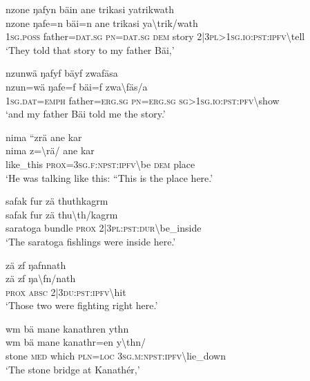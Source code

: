 \ea\label{ex:3:a7477}
nzone ŋafyn bäin ane trikasi yatrikwath\\
\gll nzone	ŋafe=n	bäi=n	ane	trikasi	ya{\textbackslash}trik/wath\\
     1\textsc{sg}.\textsc{poss}	father=\textsc{dat}.\textsc{sg}	\textsc{pn}=\textsc{dat}.\textsc{sg}	\textsc{dem}	story	2|3\textsc{pl}>1\textsc{sg}.\textsc{io}:\textsc{pst}:\textsc{ipfv}{\textbackslash}tell\\
\glt `They told that story to my father Bäi,'
\z

\newpage
\ea\label{ex:3:a7478}
nzunwä ŋafyf bäyf zwafäsa\\
\gll nzun=wä	ŋafe=f	bäi=f	zwa{\textbackslash}fäs/a\\
     1\textsc{sg}.\textsc{dat}=\textsc{emph}	father=\textsc{erg}.\textsc{sg}	\textsc{pn}=\textsc{erg}.\textsc{sg}	\textsc{sg}>1\textsc{sg}.\textsc{io}:\textsc{pst}:\textsc{pfv}{\textbackslash}show\\
\glt `and my father Bäi told me the story.'
\z

\ea\label{ex:3:a7480}
nima ``zrä ane kar\\
\gll nima	z={\textbackslash}rä/	ane	kar\\
     like\_this	\textsc{prox}=3\textsc{sg}.\textsc{f}:\textsc{npst}:\textsc{ipfv}{\textbackslash}be	\textsc{dem}	place\\
\glt `He was talking like this: ``This is the place here.'
\z

\ea\label{ex:3:a7481}
safak fur zä thuthkagrm\\
\gll safak	fur	zä	thu{\textbackslash}th/kagrm\\
     saratoga	bundle	\textsc{prox}	2|3\textsc{pl}:\textsc{pst}:\textsc{dur}{\textbackslash}be\_inside\\
\glt `The saratoga fishlings were inside here.'
\z

\ea\label{ex:3:a7482}
zä zf ŋafnnath\\
\gll zä	zf	ŋa{\textbackslash}fn/nath\\
     \textsc{prox}	\textsc{absc}	2|3\textsc{du}:\textsc{pst}:\textsc{ipfv}{\textbackslash}hit\\
\glt `Those two were fighting right here.'
\z

\ea\label{ex:3:a7483}
wm bä mane kanathren ythn\\
\gll wm	bä	mane	kanathr=en	y{\textbackslash}thn/\\
     stone	\textsc{med}	which	\textsc{pln}=\textsc{loc}	3\textsc{sg}.\textsc{m}:\textsc{npst}:\textsc{ipfv}{\textbackslash}lie\_down\\
\glt `The stone bridge at Kanathér,'
\z

